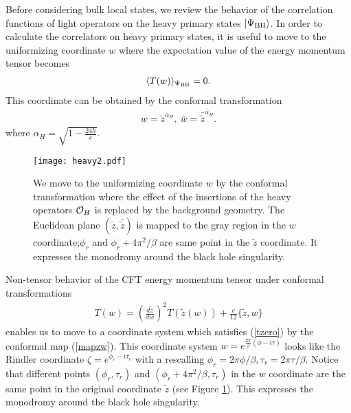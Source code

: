 \documentclass[11pt,a4paper]{article}
\def\a{{\alpha}}
\def\s{\sqrt}
\def\CO{{\cal O}}
\def\ba{\begin{eqnarray}}
\def\ea{\end{eqnarray}}
\def\f {\frac}
\def\la{\langle}
\def\lb{\rangle}
\begin{document}
Before considering bulk local states, we review the behavior of the correlation functions of light operators on the heavy primary states $|\Psi_{\rm BH}\lb$. In order to calculate the correlators on heavy primary states, it is useful to move to the uniformizing coordinate $w$ \cite{FKW2} where the expectation value of the energy momentum tensor becomes
\ba
\la T(w)\lb_{\Psi_{\rm BH}}=0.\label{tzero}
\ea
This coordinate can be obtained by the conformal transformation
\ba
w=\tilde{z}^{\a_H},\ \bar{w}=\bar{\tilde{z}}^{\bar{\a}_H}.\label{mapzw}
\ea
where $ \a_H=\s{1-\f{24h}{c}}$.
 \begin{figure}[h!]
\begin{center}
  \texttt{[image: heavy2.pdf]}
  \caption{We move to the uniformizing coordinate $w$ by the conformal transformation where the effect of the insertions of the heavy operators $\CO_H$ is replaced by the background geometry. The Euclidean plane $(\tilde{z},\bar{\tilde{z}})$ is mapped to the gray region in the $w$ coordinate;$\phi_r$ and $\phi_r+4\pi^2/\beta$ are same point in the $\tilde{z}$ coordinate. It expresses the monodromy around the black hole singularity.}
  \label{heavyBTZ}
 \end{center}
\end{figure}
Non-tensor behavior of the CFT energy momentum tensor under conformal transformations
\ba
T(w)=\left(\f{d\tilde{z}}{dw}\right)^2T(\tilde{z}(w))+\f{c}{12}\{\tilde{z},w\}
\ea
enables us to move to a coordinate system which satisfies (\ref{tzero}) by the conformal map (\ref{mapzw}).
This coordinate system $w=e^{\f{2\pi}{\beta}(\phi-i\tau)}$ looks like the Rindler coordinate $\zeta=e^{\phi_r-i\tau_r}$ with a rescalling $\phi_r=2\pi\phi/\beta,\tau_r=2\pi\tau/\beta$. Notice that different points $(\phi_r,\tau_r)$ and $(\phi_r+4\pi^2/\beta,\tau_r)$ in the $w$ coordinate are the same point in the original coordinate $\tilde{z}$ (see Figure \ref{heavyBTZ}). This expresses the monodromy around the black hole singularity. 
\end{document}

